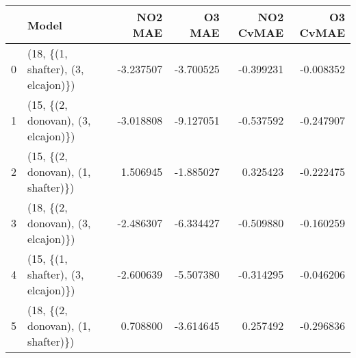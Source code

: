\begin{tabular}{llrrrr}
\toprule
{} &                               Model &   NO2 MAE &    O3 MAE &  NO2 CvMAE &  O3 CvMAE \\
\midrule
0 &  (18, \{(1, shafter), (3, elcajon)\}) & -3.237507 & -3.700525 &  -0.399231 & -0.008352 \\
1 &  (15, \{(2, donovan), (3, elcajon)\}) & -3.018808 & -9.127051 &  -0.537592 & -0.247907 \\
2 &  (15, \{(2, donovan), (1, shafter)\}) &  1.506945 & -1.885027 &   0.325423 & -0.222475 \\
3 &  (18, \{(2, donovan), (3, elcajon)\}) & -2.486307 & -6.334427 &  -0.509880 & -0.160259 \\
4 &  (15, \{(1, shafter), (3, elcajon)\}) & -2.600639 & -5.507380 &  -0.314295 & -0.046206 \\
5 &  (18, \{(2, donovan), (1, shafter)\}) &  0.708800 & -3.614645 &   0.257492 & -0.296836 \\
\bottomrule
\end{tabular}
